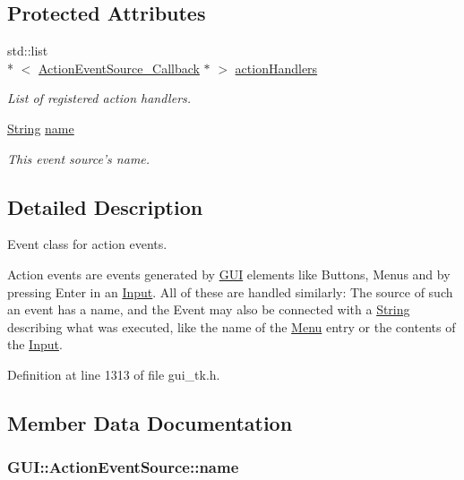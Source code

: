 \subsection*{Protected Attributes}
\begin{DoxyCompactItemize}
\item 
\hypertarget{classGUI_1_1ActionEventSource_a9cd3562084ba5fa2b3d9d72ac3fa1baa}{std\-::list\\*
$<$ \hyperlink{structGUI_1_1ActionEventSource__Callback}{Action\-Event\-Source\-\_\-\-Callback} $\ast$ $>$ \hyperlink{classGUI_1_1ActionEventSource_a9cd3562084ba5fa2b3d9d72ac3fa1baa}{action\-Handlers}}\label{classGUI_1_1ActionEventSource_a9cd3562084ba5fa2b3d9d72ac3fa1baa}

\begin{DoxyCompactList}\small\item\em List of registered action handlers. \end{DoxyCompactList}\item 
\hyperlink{classGUI_1_1String}{String} \hyperlink{classGUI_1_1ActionEventSource_ab494e66ccff6518e1cabe747df2173f8}{name}
\begin{DoxyCompactList}\small\item\em This event source's name. \end{DoxyCompactList}\end{DoxyCompactItemize}


\subsection{Detailed Description}
Event class for action events. 

Action events are events generated by \hyperlink{namespaceGUI}{G\-U\-I} elements like Buttons, Menus and by pressing Enter in an \hyperlink{classGUI_1_1Input}{Input}. All of these are handled similarly\-: The source of such an event has a name, and the Event may also be connected with a \hyperlink{classGUI_1_1String}{String} describing what was executed, like the name of the \hyperlink{classGUI_1_1Menu}{Menu} entry or the contents of the \hyperlink{classGUI_1_1Input}{Input}. 

Definition at line 1313 of file gui\-\_\-tk.\-h.



\subsection{Member Data Documentation}
\hypertarget{classGUI_1_1ActionEventSource_ab494e66ccff6518e1cabe747df2173f8}{
\subsubsection[{name}]{ {\bf G\-U\-I\-::\-Action\-Event\-Source\-::name}}}\label{classGUI_1_1ActionEventSource_ab494e66ccff6518e1cabe747df2173f8}


